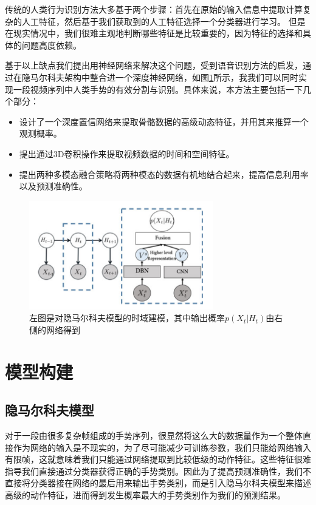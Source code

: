 \documentclass[a4paper, 12pt]{article}
\begin{document}
传统的人类行为识别方法大多基于两个步骤：首先在原始的输入信息中提取计算复杂的人工特征，然后基于我们获取到的人工特征选择一个分类器进行学习。
但是在现实情况中，我们很难主观地判断哪些特征是比较重要的，因为特征的选择和具体的问题高度依赖。

基于以上缺点我们提出用神经网络来解决这个问题，受到语音识别方法的启发\cite{p1}，通过在隐马尔科夫架构中整合进一个深度神经网络，如图\ref{fig:1}所示，我我们可以同时实现一段视频序列中人类手势的有效分割与识别。具体来说，本方法主要包括一下几个部分：
\begin{itemize}
\item 设计了一个深度置信网络来提取骨骼数据的高级动态特征，并用其来推算一个观测概率。
\item 提出通过3D卷积操作来提取视频数据的时间和空间特征。
\item 提出两种多模态融合策略将两种模态的数据有机地结合起来，提高信息利用率以及预测准确性。
\end{itemize}
\begin{figure}[ht]
  \centering
  \includegraphics[width=8cm]{HMM.png}
\caption{左图是对隐马尔科夫模型的时域建模，其中输出概率$p(X_t|H_t)$由右侧的网络得到}
  \label{fig:1}
\end{figure}

\section{模型构建}
\subsection{隐马尔科夫模型}
\label{ss:1}
对于一段由很多复杂帧组成的手势序列，很显然将这么大的数据量作为一个整体直接作为网络的输入是不现实的，为了尽可能减少可训练参数，我们只能给网络输入有限帧，这就意味着我们只能通过网络提取到比较低级的动作特征。这些特征很难指导我们直接通过分类器获得正确的手势类别。因此为了提高预测准确性，我们不直接将分类器接在网络的最后用来输出手势类别，而是引入隐马尔科夫模型来描述高级的动作特征，进而得到发生概率最大的手势类别作为我们的预测结果。
\end{document}
